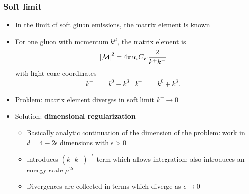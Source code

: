 \documentclass{beamer}
\begin{document}
	\begin{frame}
		\frametitle{Soft limit}

		\begin{itemize}
			\item In the limit of soft gluon emissions, the matrix element is known \cite{catani_infrared_2000} 

			\item For one gluon with momentum $k^\mu$, the matrix element is
			\begin{equation}
				\abs{\mathcal{M}}^2 = 4\pi\alpha_s C_F \frac{2}{k^+ k^-}
			\end{equation}
			with light-cone coordinates
			\begin{align}
				k^+ &= k^0 - k^3 & k^- &= k^0 + k^3.
			\end{align}

			\item Problem: matrix element diverges in soft limit $k^- \to 0$

			\item Solution: \textbf{dimensional regularization} \cite{schwartz_quantum_2014}
			\begin{itemize}
				\item Basically analytic continuation of the dimension of the problem: work in $d = 4 - 2\epsilon$ dimensions with $\epsilon > 0$

				\item Introduces $(k^+ k^-)^{-\epsilon}$ term which allows integration; also introduces an energy scale $\mu^{2\epsilon}$

				\item Divergences are collected in terms which diverge as $\epsilon \to 0$
			\end{itemize}
		\end{itemize}
	\end{frame}
\end{document}
